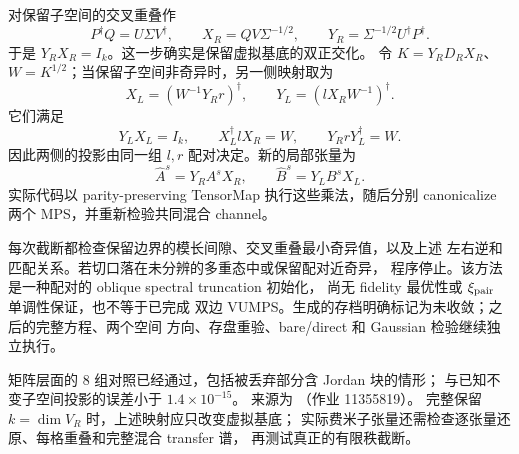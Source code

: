 对保留子空间的交叉重叠作
\begin{equation}
 P^\dagger Q=U\Sigma V^\dagger,\qquad
 X_R=QV\Sigma^{-1/2},\qquad
 Y_R=\Sigma^{-1/2}U^\dagger P^\dagger.
\end{equation}
于是 $Y_RX_R=I_k$。这一步确实是保留虚拟基底的双正交化。
令 $K=Y_RD_RX_R$、$W=K^{1/2}$；当保留子空间非奇异时，另一侧映射取为
\begin{equation}
 X_L=(W^{-1}Y_Rr)^\dagger,\qquad
 Y_L=(lX_RW^{-1})^\dagger.
\end{equation}
它们满足
\begin{equation}
 Y_LX_L=I_k,\qquad X_L^\dagger lX_R=W,
 \qquad Y_RrY_L^\dagger=W.
\end{equation}
因此两侧的投影由同一组 $l,r$ 配对决定。新的局部张量为
\begin{equation}
 \widehat A^s=Y_RA^sX_R,\qquad
 \widehat B^s=Y_LB^sX_L.
\end{equation}
实际代码以 parity-preserving TensorMap 执行这些乘法，随后分别
canonicalize 两个 MPS，并重新检验共同混合 channel。

\begin{center}
\end{center}

每次截断都检查保留边界的模长间隙、交叉重叠最小奇异值，以及上述
左右逆和匹配关系。若切口落在未分辨的多重态中或保留配对近奇异，
程序停止。该方法是一种配对的 oblique spectral truncation 初始化，
尚无 fidelity 最优性或 $\xi_{\rm pair}$ 单调性保证，也不等于已完成
双边 VUMPS。生成的存档明确标记为未收敛；之后的完整方程、两个空间
方向、存盘重验、bare/direct 和 Gaussian 检验继续独立执行。

矩阵层面的 8 组对照已经通过，包括被丢弃部分含 Jordan 块的情形；
与已知不变子空间投影的误差小于 $1.4\times10^{-15}$。
来源为 （作业 11355819）。
完整保留 $k=\dim V_R$ 时，上述映射应只改变虚拟基底；
实际费米子张量还需检查逐张量还原、每格重叠和完整混合 transfer 谱，
再测试真正的有限秩截断。

